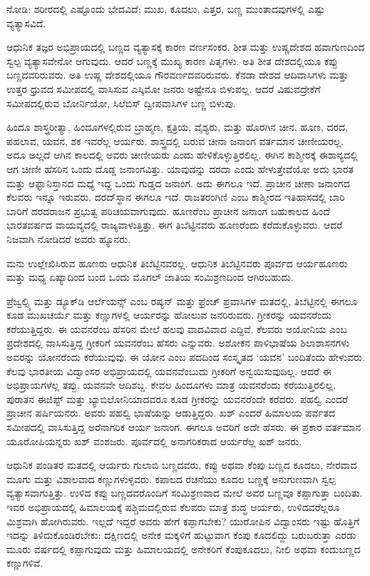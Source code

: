 ನೋಡಿ; ಶರೀರದಲ್ಲಿ ಎಷ್ಟೊಂದು ಭೇದವಿದೆ; ಮುಖ, ಕೂದಲು, ಎತ್ತರ, ಬಣ್ಣ ಮುಂತಾದವುಗಳಲ್ಲಿ ಎಷ್ಟು ವ್ಯತ್ಯಾಸವಿದೆ.

ಆಧುನಿಕ ತಜ್ಞರ ಅಭಿಪ್ರಾಯದಲ್ಲಿ ಬಣ್ಣದ ವ್ಯತ್ಯಾಸಕ್ಕೆ ಕಾರಣ ವರ್ಣಸಂಕರ. ಶೀತ ಮತ್ತು ಉಷ್ಣದೇಶದ ಹವಾಗುಣದಿಂದ ಸ್ವಲ್ಪ ವ್ಯತ್ಯಾಸವೇನೋ ಆಗುವುದು. ಆದರೆ ಬಣ್ಣಕ್ಕೆ ಮುಖ್ಯ ಕಾರಣ ಪಿತೃಗಳು. ಅತಿ ಶೀತ ದೇಶದಲ್ಲಿಯೂ ಕಪ್ಪು ಬಣ್ಣದವರಿರುವರು. ಅತಿ ಉಷ್ಣ ದೇಶದಲ್ಲಿಯೂ ಗೌರವರ್ಣದವರಿರುವರು. ಕೆನಡಾ ದೇಶದ ಆದಿವಾಸಿಗಳು ಮತ್ತು ಉತ್ತರ ಧ್ರುವದ ಸಮೀಪದಲ್ಲಿ ವಾಸಿಸುವ ಎಸ್ಕಿಮೋ ಜನರು ಅಷ್ಟೇನೂ ಬಿಳುಪಲ್ಲ. ಆದರೆ ವಿಷುವದ್ರೇಕೆಗೆ ಸಮೀಪದಲ್ಲಿರುವ ಬೋರ್ನಿಯೋ, ಸಿಲೆಬಿಸ್​ ದ್ವೀಪವಾಸಿಗಳ ಬಣ್ಣ ಬಿಳುಪು.

ಹಿಂದೂ ಶಾಸ್ತ್ರರೀತ್ಯಾ, ಹಿಂದೂಗಳಲ್ಲಿರುವ ಬ್ರಾಹ್ಮಣ, ಕ್ಷತ್ರಿಯ, ವೈಶ್ಯರು, ಮತ್ತು ಹೊರಗಿನ ಚೀನ, ಹೂಣ, ದರದ, ಪಹಲಾವ, ಯವನ, ಶಕ ಇವರೆಲ್ಲ ಆರ್ಯರು. ಶಾಸ್ತ್ರದಲ್ಲಿ ಬರುವ ಚೀನಾ ಜನಾಂಗ ವರ್ತಮಾನ ಚೀಣೀಯರಲ್ಲ. ಅದೂ ಅಲ್ಲದೆ ಆಗಿನ ಕಾಲದಲ್ಲಿ ಅವರು ಚೀಣೀಯರು ಎಂದು ಹೇಳಿಕೊಳ್ಳುತ್ತಿರಲಿಲ್ಲ. ಈಗಿನ ಕಾಶ್ಮೀರಕ್ಕೆ ಈಶಾನ್ಯದಲ್ಲಿ ಆಗ ಚೀಣೀ ಹೆಸರಿನ ಒಂದು ದೊಡ್ಡ ಜನಾಂಗವಿತ್ತು. ಯಾವುದನ್ನು ದರದಾ ಎಂದು ಹೇಳುತ್ತೇವೆಯೋ ಅದು ಭಾರತ ಮತ್ತು ಆಫ್ಘಾನಿಸ್ತಾನದ ಮಧ್ಯೆ ಇದ್ದ ಒಂದು ಗುಡ್ಡದ ಜನಾಂಗ. ಅದು ಈಗಲೂ ಇದೆ. ಪ್ರಾಚೀನ ಚೀಣಾ ಜನಾಂಗದ ಕೆಲವರು ಇನ್ನೂ ಇರುವರು. ದರದ್​ಸ್ಥಾನ ಈಗಲೂ ಇದೆ. ರಾಜತರಂಗಿಣಿ ಎಂಬ ಕಾಶ್ಮೀರದ ಇತಿಹಾಸದಲ್ಲಿ ಬಾರಿ ಬಾರಿಗೆ ದರದರಾಜನ ಪ್ರಭುತ್ವ ಪರಿಚಯವಾಗುವುದು. ಹೂಣರೆಂಬ ಪ್ರಾಚೀನ ಜನಾಂಗ ಬಹುಕಾಲದ ಹಿಂದೆ ಭಾರತವರ್ಷದ ವಾಯವ್ಯದಲ್ಲಿ ರಾಜ್ಯವಾಳುತ್ತಿತ್ತು. ಈಗ ತಿಬೆಟ್ಟಿನವರು ಹೂಣರೆಂದು ಕರೆದುಕೊಳ್ಳುವರು. ಆದರೆ ನಿಜವಾಗಿ ನೋಡಿದರೆ ಅವರು ಹ್ಯೂನರು.

\newpage

ಮನು ಉಲ್ಲೇಖಿಸಿರುವ ಹೂಣರು ಆಧುನಿಕ ತಿಬೆಟ್ಟಿನವರಲ್ಲ. ಆಧುನಿಕ ತಿಬೆಟ್ಟಿನವರು ಪೂರ್ವದ ಆರ್ಯಹೂಣರು ಮತ್ತು ಮಧ್ಯ ಏಷ್ಯಾದಿಂದ ಬಂದ ಒಂದು ಮೊಗಲ್​ ಜಾತಿಯ ಸಂಮಿಶ್ರಣದಿಂದ ಆಗಿರಬಹುದು.

ಪ್ರೆಜ್ವಲ್ಸ್ಕಿ ಮತ್ತು ಡ್ಯೂಕ್​ಡಿ ಆರ್ಲೆಯನ್ಸ್​ ಎಂಬ ರಷ್ಯನ್​ ಮತ್ತು ಫ್ರೆಂಚ್​ ಪ್ರವಾಸಿಗಳ ಮತದಲ್ಲಿ, ತಿಬೆಟ್ಟಿನಲ್ಲಿ ಈಗಲೂ ಕೂಡ ಮುಖಚರ್ಯೆ ಮತ್ತು ಕಣ್ಣುಗಳಲ್ಲಿ ಆರ್ಯರನ್ನು ಹೋಲುವ ಜನರಿರುವರು. ಗ್ರೀಕರನ್ನು ಯವನರೆಂದು ಕರೆಯುತ್ತಿದ್ದರು. ಈ ಯವನರೆಂಬ ಹೆಸರಿನ ಮೇಲೆ ಹಲವು ವಾದವಿವಾದ ಎದ್ದಿವೆ. ಕೆಲವರು ಅಯೋನಿಯ ಎಂಬ ಪ್ರದೇಶದಲ್ಲಿ ವಾಸಿಸುತ್ತಿದ್ದ ಗ್ರೀಕರಿಗೆ ಯವನರೆಂಬ ಹೆಸರು ಎನ್ನುವರು. ಅಶೋಕನ ಪಾಳಿಭಾಷೆಯ ಶಿಲಾಶಾಸನಗಳು ಅವರನ್ನು ಯೋನರೆಂದು ಕರೆಯುವುವು. ಈ ಯೋನ ಎಂಬ ಪದದಿಂದ ಸಂಸ್ಕೃತದ ‘ಯವನ’ ಬಂದಿತೆಂದು ಹೇಳುವರು. ಕೆಲವು ಭಾರತೀಯ ವಿದ್ವಾಂಸರ ಅಭಿಪ್ರಾಯದಲ್ಲಿ ಯವನವೆಂಬುದು ಗ್ರೀಕರಿಗೆ ಅನ್ವಯಿಸುವುದಿಲ್ಲ. ಆದರೆ ಈ ಅಭಿಪ್ರಾಯಗಳೆಲ್ಲ ತಪ್ಪು. ಯವನವೇ ಆದಿಶಬ್ದ. ಕೇವಲ ಹಿಂದೂಗಳು ಮಾತ್ರ ಯವನರೆಂದು ಕರೆಯುತ್ತಿರಲಿಲ್ಲ. ಪುರಾತನ ಈಜಿಪ್ಟ್​ ಮತ್ತು ಬ್ಯಾಬಿಲೋನಿಯಾದವರೂ ಕೂಡ ಗ್ರೀಕರನ್ನು ಯವನರೆಂದೇ ಕರೆದರು. ಪಹಲ್ವಿ ಎಂದರೆ ಪ್ರಾಚೀನ ಪರ್ಷಿಯನರು. ಅವರು ಪಹಲ್ವಿ ಭಾಷೆಯನ್ನು ಆಡುತ್ತಿದ್ದರು. ಖಶ್​ ಎಂದರೆ ಹಿಮಾಲಯ ಪರ್ವತದ ಸಮೀಪದಲ್ಲಿ ವಾಸಿಸುತ್ತಿದ್ದ ಅರೆನಾಗರಿಕ ಆರ್ಯ ಜನಾಂಗ. ಈಗಲೂ ಅವರಿಗೆ ಅದೇ ಹೆಸರು. ಈ ಪ್ರಕಾರ ವರ್ತಮಾನ ಯೂರೋಪಿಯನ್ನರು ಖಶ್​ ವಂಶಜರು. ಪೂರ್ವದಲ್ಲಿ ಅನಾಗರಿಕರಾದ ಆರ್ಯರೆಲ್ಲ ಖಶ್​ ಜನರು.

ಆಧುನಿಕ ಪಂಡಿತರ ಮತದಲ್ಲಿ ಆರ್ಯರು ಗುಲಾಬಿ ಬಣ್ಣದವರು, ಕಪ್ಪು ಅಥವಾ ಕೆಂಪು ಬಣ್ಣದ ಕೂದಲು, ನೇರವಾದ ಮೂಗು ಮತ್ತು ವಿಶಾಲವಾದ ಕಣ್ಣುಗಳುಳ್ಳವರು. ಕಪಾಲದ ರಚನೆಯು ಕೂದಲ ಬಣ್ಣಕ್ಕೆ ಅನುಗುಣವಾಗಿ ಸ್ವಲ್ಪ ವ್ಯತ್ಯಾಸವಾಗುತ್ತಿತ್ತು. ಉಳಿದ ಕಪ್ಪು ಬಣ್ಣದವರೊಂದಿಗೆ ಸಂಮಿಶ್ರಣವಾದ ಮೇಲೆ ಅವರ ಬಣ್ಣವೂ ಕಪ್ಪಾಗುತ್ತಾ ಬಂದಿತು. ಇವರ ಅಭಿಪ್ರಾಯದಲ್ಲಿ ಹಿಮಾಲಯಕ್ಕೆ ಪಶ್ಚಿಮದಲ್ಲಿರುವ ಕೆಲವರು ಮಾತ್ರ ಶುದ್ಧ ಆರ್ಯರು, ಉಳಿದವರೆಲ್ಲರೂ ಮಿಶ್ರವಾಗಿ ಹೋಗಿರುವರು. ಇಲ್ಲದೆ ಇದ್ದರೆ ಅವರು ಹೇಗೆ ಕಪ್ಪಾಗಬೇಕು? ಯುರೋಪಿನ ವಿದ್ವಾಂಸರು ಇಷ್ಟು ಹೊತ್ತಿಗೆ ಇದನ್ನು ತಿಳಿದುಕೊಂಡಿರಬೇಕು: ದಕ್ಷಿಣದಲ್ಲಿ ಅನೇಕ ಮಕ್ಕಳಿಗೆ ಹುಟ್ಟುವಾಗ ಕೆಂಪು ಕೂದಲಿದ್ದು ಬರುಬರುತ್ತಾ ಎರಡು ಮೂರು ವರ್ಷದಲ್ಲಿ ಕಪ್ಪಾಗುವುದು ಮತ್ತು ಹಿಮಾಲಯದಲ್ಲಿ ಅನೇಕರಿಗೆ ಕೆಂಪುಕೂದಲು, ನೀಲಿ ಅಥವಾ ಕಂದುಬಣ್ಣದ ಕಣ್ಣುಗಳಿವೆ.

